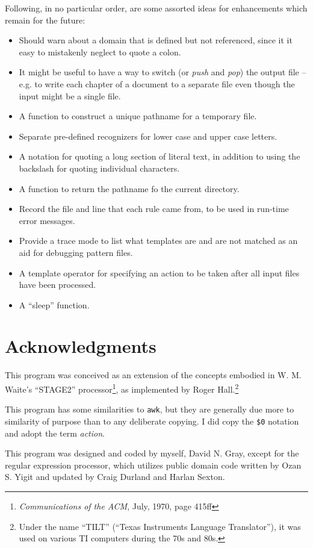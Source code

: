 Following, in no particular order, are some assorted ideas for
enhancements which remain for the future:
\begin{itemize}
\item Should warn about a domain that is defined but not referenced,
since it it easy to mistakenly neglect to quote a colon.
\item It might be useful to have a way to switch 
(or {\em push} and {\em pop}) the output
file -- e.g. to write each chapter of a document to a separate file
even though the input might be a single file.
\item A function to construct a unique pathname for a temporary file.
\item Separate pre-defined recognizers for lower case and upper case letters.
\item A notation for quoting a long section of
literal text, in addition to using the backslash for quoting individual
characters.
\item A function to return the pathname fo the current directory.
\item Record the file and line that each rule came from, to be used in
run-time error messages.
\item Provide a trace mode to list what
templates are and are not matched as an aid for debugging pattern files.
\item A template operator for specifying an action to be taken after all
input files have been processed.
\item A ``sleep'' function.
\end{itemize}

\section{Acknowledgments}

This program was conceived as an extension of the concepts
embodied in W. M. Waite's ``STAGE2'' processor\footnote{{\em
Communications of the ACM}, July, 1970, page 415ff}, as implemented by
Roger Hall.\footnote{Under the name ``TILT'' (``Texas Instruments
Language Translator''), it was used on various TI computers during the
70s and 80s.}

This program has some similarities to {\tt awk}, but
they are generally due more to similarity of purpose than to any
deliberate copying.  I did copy the \verb/$0/ notation and adopt the term
{\em action}.

This program was designed and coded by myself, David N. Gray, except for the
regular expression processor, which utilizes public domain code written
by Ozan S. Yigit and updated by Craig Durland and Harlan Sexton.
